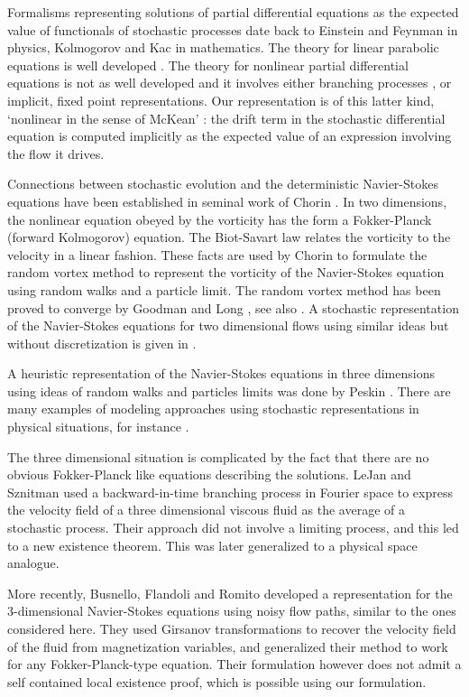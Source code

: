 \documentclass[final]{amsart}%
\numberwithin{equation}{section}
\theoremstyle{definition}
\theoremstyle{remark}
\begin{document}
Formalisms representing solutions of partial differential equations as the expected value of functionals of stochastic processes date back to Einstein and Feynman in physics, Kolmogorov and Kac in mathematics. The theory for linear parabolic equations is well developed \cite{friedman,ks}. The theory for nonlinear partial differential equations is not as well developed and it  involves either branching processes \cite{legall}, or implicit, fixed point representations. Our representation is of this latter kind, `nonlinear in the sense of McKean'%
: the drift term in the stochastic differential equation is computed implicitly
 as the expected value of an expression involving the flow it drives.
 
Connections between stochastic evolution and the deterministic Navier-Stokes equations have been established in seminal work of Chorin \cite{chorin}. In two dimensions, the nonlinear equation obeyed by the vorticity has the form a Fokker-Planck (forward Kolmogorov) equation. The Biot-Savart law relates the vorticity to the velocity in a linear fashion. These facts are used by Chorin to formulate the random vortex method to represent the vorticity of the Navier-Stokes equation using random walks and a particle limit. The random vortex method has been proved to converge by Goodman \cite{goodman} and Long \cite{long}, see also \cite{mb}. A stochastic representation of the Navier-Stokes equations for two dimensional flows using similar ideas but without 
discretization is given in \cite{bf2d}. 

A heuristic representation of the Navier-Stokes equations in three
dimensions using ideas of random walks and particles limits was done by Peskin \cite{peskin}. There are many examples of modeling approaches using stochastic 
representations in physical situations, for instance \cite{chorin1, pope}. 

The three dimensional situation is complicated by the fact that there are no obvious Fokker-Planck like equations describing the solutions. LeJan and Sznitman \cite{sznit} used a backward-in-time branching process in Fourier space to express the velocity field of a three dimensional viscous fluid as the average of a stochastic process. Their approach did not involve a limiting process, and this led to a new existence theorem. This was later generalized \cite{ossiander} to a physical space analogue. 

More recently, Busnello, Flandoli and Romito developed a representation for the $3$-dimensional Navier-Stokes equations using noisy flow paths, similar to the ones considered here. They used Girsanov transformations to recover the velocity field of the fluid from magnetization variables, and generalized their method to work for any Fokker-Planck-type equation. Their formulation however does not admit a self contained local existence proof, which is possible using our formulation.
\end{document}
